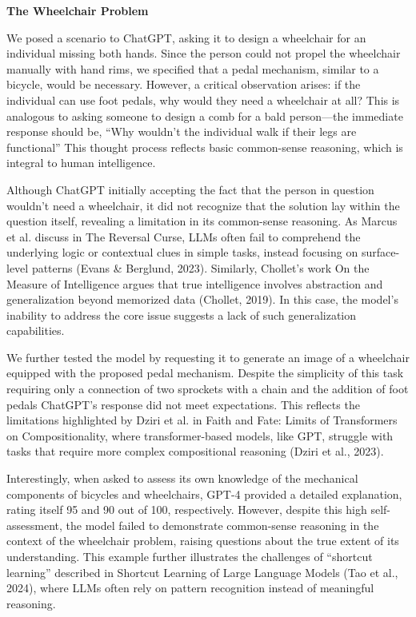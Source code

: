 \documentclass[11pt]{scrartcl}
\begin{document}
\begin{huge}
\textbf{The Wheelchair Problem}
\end{huge}
We posed a scenario to ChatGPT, asking it to design a wheelchair for an individual missing both hands. Since the person could not propel the wheelchair manually with hand rims, we specified that a pedal mechanism, similar to a bicycle, would be necessary. However, a critical observation arises: if the individual can use foot pedals, why would they need a wheelchair at all? This is analogous to asking someone to design a comb for a bald person—the immediate response should be, “Why wouldn’t the individual walk if their legs are functional” This thought process reflects basic common-sense reasoning, which is integral to human intelligence.

Although ChatGPT initially accepting the fact that the person in question wouldn’t need a wheelchair, it did not recognize that the solution lay within the question itself, revealing a limitation in its common-sense reasoning. As Marcus et al. discuss in The Reversal Curse\cite{ref1}, LLMs often fail to comprehend the underlying logic or contextual clues in simple tasks, instead focusing on surface-level patterns (Evans \& Berglund, 2023)\cite{ref1}. Similarly, Chollet’s work On the Measure of Intelligence argues that true intelligence involves abstraction and generalization beyond memorized data (Chollet, 2019)\cite{ref3}. In this case, the model’s inability to address the core issue suggests a lack of such generalization capabilities.

We further tested the model by requesting it to generate an image of a wheelchair equipped with the proposed pedal mechanism. Despite the simplicity of this task requiring only a connection of two sprockets with a chain and the addition of foot pedals ChatGPT’s response did not meet expectations. This reflects the limitations highlighted by Dziri et al. in Faith and Fate: Limits of Transformers on Compositionality, where transformer-based models, like GPT, struggle with tasks that require more complex compositional reasoning (Dziri et al., 2023)\cite{ref4}.

Interestingly, when asked to assess its own knowledge of the mechanical components of bicycles and wheelchairs, GPT-4 provided a detailed explanation, rating itself 95 and 90 out of 100, respectively. However, despite this high self-assessment, the model failed to demonstrate common-sense reasoning in the context of the wheelchair problem, raising questions about the true extent of its understanding. This example further illustrates the challenges of “shortcut learning” described in Shortcut Learning of Large Language Models (Tao et al., 2024)\cite{ref5}, where LLMs often rely on pattern recognition instead of meaningful reasoning.
\end{document}
